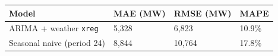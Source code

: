 
\begin{tabular}{llll}
\toprule
Model & MAE (MW) & RMSE (MW) & MAPE\\
\midrule
ARIMA + weather \texttt{xreg} & 5,328 & 6,823 & 10.9\%\\
Seasonal naive (period 24) & 8,844 & 10,764 & 17.8\%\\
\bottomrule
\end{tabular}
